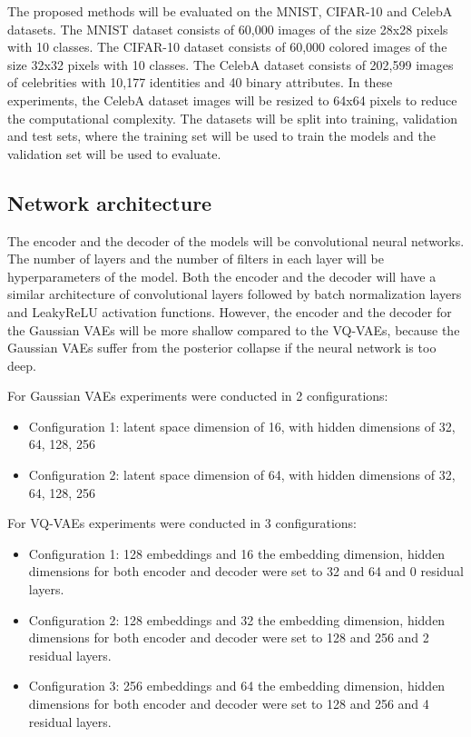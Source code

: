 The proposed methods will be evaluated on the MNIST, CIFAR-10 and CelebA datasets. The MNIST dataset consists of 60,000 images of the size 28x28 pixels with 10 classes. The CIFAR-10 dataset consists of 60,000 colored images of the size 32x32 pixels with 10 classes.
The CelebA dataset consists of 202,599 images of celebrities with 10,177 identities and 40 binary attributes. In these experiments, the CelebA dataset images will be resized to 64x64 pixels to reduce the computational complexity.
The datasets will be split into training, validation and test sets, where the training set will be used to train the models and the validation set will be used to evaluate.

\subsection{Network architecture}

The encoder and the decoder of the models will be convolutional neural networks. The number of layers and the number of filters in each layer will be hyperparameters of the model. Both the encoder and the decoder will have a similar architecture of convolutional layers followed by batch normalization layers and LeakyReLU activation functions. However, the encoder and the decoder for the Gaussian VAEs will be more shallow compared to the VQ-VAEs, because the Gaussian VAEs suffer from the posterior collapse if the neural network is too deep. 

For Gaussian VAEs experiments were conducted in 2 configurations:

\begin{itemize}
    \item Configuration 1: latent space dimension of 16, with hidden dimensions of 32, 64, 128, 256
    \item Configuration 2: latent space dimension of 64, with hidden dimensions of 32, 64, 128, 256
\end{itemize}

For VQ-VAEs experiments were conducted in 3 configurations:

\begin{itemize}
    \item Configuration 1: 128 embeddings and 16 the embedding dimension, hidden dimensions for both encoder and decoder were set to 32 and 64 and 0 residual layers.
    \item Configuration 2: 128 embeddings and 32 the embedding dimension, hidden dimensions for both encoder and decoder were set to 128 and 256 and 2 residual layers.
    \item Configuration 3: 256 embeddings and 64 the embedding dimension, hidden dimensions for both encoder and decoder were set to 128 and 256 and 4 residual layers.
\end{itemize}




